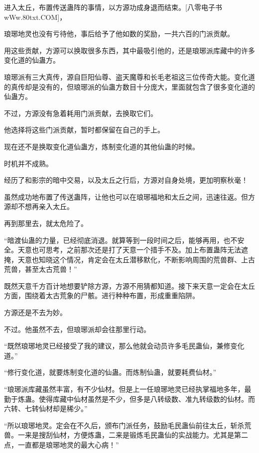 
\begin{this_body}

进入太丘，布置传送蛊阵的事情，以方源功成身退而结束。[八零电子书wWw.80txt.COM]，

琅琊地灵也没有亏待他，事后给予了他如数的奖励，一共六百的门派贡献。

用这些贡献，方源可以换取很多东西，其中最吸引他的，还是琅琊派库藏中的许多变化道的仙蛊方。

琅琊派有三大真传，源自巨阳仙尊、盗天魔尊和长毛老祖这三位传奇大能。变化道的真传却是没有的，但琅琊派的仙蛊方数目十分庞大，里面就包含了很多变化道的仙蛊方。

不过，方源没有急着耗用门派贡献，去换取它们。

他选择将这些门派贡献，暂时都保留在自己的手上。

现在还不是换取变化道仙蛊方，炼制变化道的其他仙蛊的时候。

时机并不成熟。

经历了和影宗的暗中交易，以及太丘之行后，方源对自身处境，更加明察秋毫！

虽然成功地布置了传送蛊阵，让他也可以在琅琊福地和太丘之间，迅速往返。但方源却不想再亲入太丘。

再到那里去，就太危险了。

“暗渡仙蛊的力量，已经彻底消退。就算等到一段时间之后，能够再用，也不安全。天意也可思考，之前那次还是打了天意一个措手不及。加上布置蛊阵无法遮掩，天意也知晓这个情况，肯定会在太丘潜移默化，不断影响周围的荒兽群、上古荒兽，甚至太古荒兽！”

既然天意千方百计地想要铲除方源，方源不用猜都知道。接下来天意一定会在太丘方面，围绕着太古荒象的尸骸。进行种种布置，形成重重陷阱。

方源还是不去为妙。

不过。他虽然不去，但琅琊派却会往那里行动。

“既然琅琊地灵已经接受了我的建议，那么他就会动员许多毛民蛊仙，兼修变化道。”

“修行变化道，就要炼制变化道的仙蛊。而炼制仙蛊，就要耗费仙材。”

“琅琊派库藏虽然丰富，有不少仙材。但是上一任琅琊地灵已经执掌福地多年，最勤于炼蛊。使得库藏中仙材虽然是不少，但多是八转级数、准九转级数的仙材。而六转、七转仙材却是稀少。”

“所以琅琊地灵。定会在不久后，颁布门派任务，鼓励毛民蛊仙前往太丘，斩杀荒兽。一来是搜刮仙材，方便炼蛊，二来是锻炼毛民蛊仙的实战能力。尤其是第二点，一直都是琅琊地灵的最大心病！”


\end{this_body}
